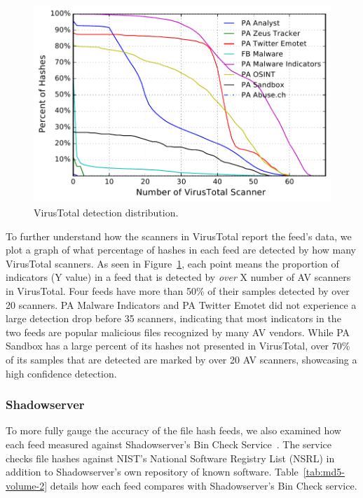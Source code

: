 \begin{figure}[t]
\includegraphics[width=0.8\columnwidth]{data_character/images/hash_vt_cdf.pdf}
\caption{VirusTotal detection distribution.}
\label{fig:vt-cdf}
\end{figure}

To further understand how the scanners in VirusTotal report the feed's data,
we plot a graph of what percentage of hashes in each feed are detected by how many
VirusTotal scanners. As seen in Figure~\ref{fig:vt-cdf}, each point means the proportion of indicators (Y value) in a feed that is detected by \textit{over} X number of AV scanners in VirusTotal. Four feeds have more
than 50\% of their samples detected by over 20 scanners. PA Malware Indicators
and PA Twitter Emotet did not experience a large detection drop before 35 scanners,
indicating that most indicators in the two feeds are popular malicious files
recognized by many AV vendors. While PA Sandbox has a large percent of its hashes
not presented in VirusTotal, over 70\% of its samples that are detected are marked
by over 20 AV scanners, showcasing a high confidence detection.

\subsubsection{Shadowserver}

To more fully gauge the accuracy of the file hash feeds,
we also examined how each feed measured against Shadowserver's Bin Check
Service~\cite{shadowserver}. The service checks file hashes against NIST's
National Software Registry List (NSRL) in addition to Shadowserver's own repository of
known software. Table~\ref{tab:md5-volume-2} details how each feed compares with
Shadowserver's Bin Check service.

